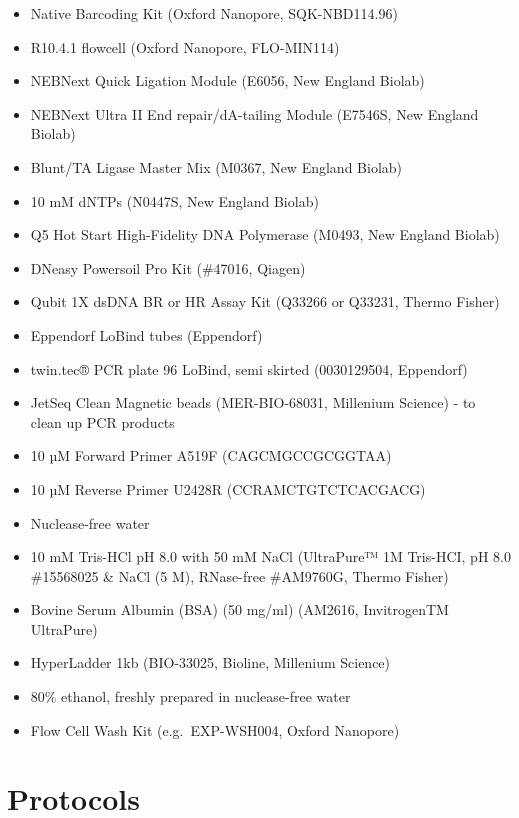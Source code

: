 \documentclass[
]{book}
\providecommand{\tightlist}{%
  \setlength{\itemsep}{0pt}\setlength{\parskip}{0pt}}
\begin{document}
\begin{itemize}
\tightlist
\item
  Native Barcoding Kit (Oxford Nanopore, SQK-NBD114.96)\\
\item
  R10.4.1 flowcell (Oxford Nanopore, FLO-MIN114)
\item
  NEBNext Quick Ligation Module (E6056, New England Biolab)
\item
  NEBNext Ultra II End repair/dA-tailing Module (E7546S, New England Biolab)
\item
  Blunt/TA Ligase Master Mix (M0367, New England Biolab)
\item
  10 mM dNTPs (N0447S, New England Biolab)
\item
  Q5 Hot Start High-Fidelity DNA Polymerase (M0493, New England Biolab)
\item
  DNeasy Powersoil Pro Kit (\#47016, Qiagen)
\item
  Qubit 1X dsDNA BR or HR Assay Kit (Q33266 or Q33231, Thermo Fisher)
\item
  Eppendorf LoBind tubes (Eppendorf)
\item
  twin.tec® PCR plate 96 LoBind, semi skirted (0030129504, Eppendorf)
\item
  JetSeq Clean Magnetic beads (MER-BIO-68031, Millenium Science) - to clean up PCR products
\item
  10 µM Forward Primer A519F (CAGCMGCCGCGGTAA) \citep{Martijn2019}
\item
  10 µM Reverse Primer U2428R (CCRAMCTGTCTCACGACG) \citep{Martijn2019}
\item
  Nuclease-free water
\item
  10 mM Tris-HCl pH 8.0 with 50 mM NaCl (UltraPure™ 1M Tris-HCI, pH 8.0 \#15568025 \& NaCl (5 M), RNase-free \#AM9760G, Thermo Fisher)
\item
  Bovine Serum Albumin (BSA) (50 mg/ml) (AM2616, InvitrogenTM UltraPure)
\item
  HyperLadder 1kb (BIO-33025, Bioline, Millenium Science)
\item
  80\% ethanol, freshly prepared in nuclease-free water
\item
  Flow Cell Wash Kit (e.g.~EXP-WSH004, Oxford Nanopore)
\end{itemize}

\section{Protocols}\label{protocols}
\end{document}
